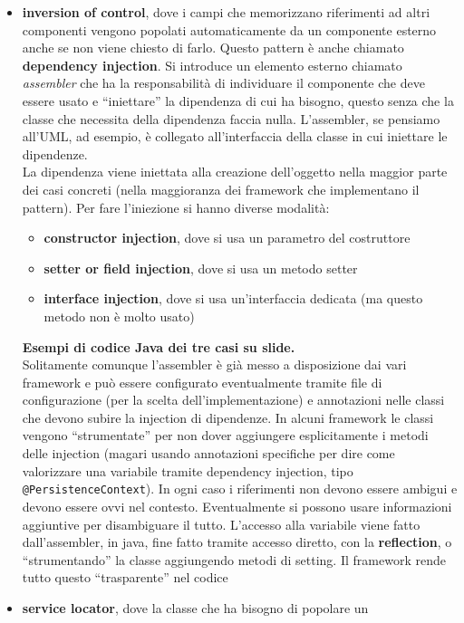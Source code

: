 \documentclass[a4paper,12pt, oneside]{book}
\begin{document}
\begin{itemize}
  \item \textbf{inversion of control}, dove i campi che memorizzano riferimenti
  ad altri componenti vengono popolati automaticamente da un componente esterno
  anche se non viene chiesto di farlo. Questo pattern è anche chiamato
  \textbf{dependency injection}. Si introduce un elemento esterno chiamato
  \textit{assembler} che ha la responsabilità di individuare il componente che
  deve essere usato e ``iniettare'' la dipendenza di cui ha bisogno, questo
  senza che la classe che necessita della dipendenza faccia nulla. L'assembler,
  se pensiamo all'UML, ad esempio, è collegato all'interfaccia della classe in
  cui iniettare le dipendenze.\\
  La dipendenza viene iniettata alla creazione dell'oggetto nella maggior parte
  dei casi concreti (nella maggioranza dei framework che implementano il
  pattern). Per fare l'iniezione si hanno diverse modalità:
  \begin{itemize}
    \item \textbf{constructor injection}, dove si usa un parametro del
    costruttore 
    \item \textbf{setter or field injection}, dove si usa un metodo setter
    \item \textbf{interface injection}, dove si usa un'interfaccia dedicata (ma
    questo metodo non è molto usato)
  \end{itemize}
  \textbf{Esempi di codice Java dei tre casi su slide.}\\
  Solitamente comunque l'assembler è già messo a disposizione dai vari framework
  e può essere configurato eventualmente tramite file di configurazione (per la
  scelta dell'implementazione) e
  annotazioni nelle classi che devono subire la injection di dipendenze. In
  alcuni framework le classi vengono ``strumentate'' per non dover aggiungere
  esplicitamente i metodi delle injection (magari usando annotazioni specifiche
  per dire come valorizzare una variabile tramite dependency injection, tipo
  \texttt{@PersistenceContext}). In ogni 
  caso i riferimenti non devono essere ambigui e devono essere ovvi nel
  contesto. Eventualmente si possono usare informazioni aggiuntive per
  disambiguare il tutto. L'accesso alla variabile viene fatto dall'assembler, in
  java, fine fatto tramite accesso diretto, con la \textbf{reflection}, o
  ``strumentando'' la classe aggiungendo metodi di setting. Il framework rende
  tutto questo ``trasparente'' nel codice
  \item \textbf{service locator}, dove la classe che ha bisogno di popolare un

\end{itemize}
\end{document}
